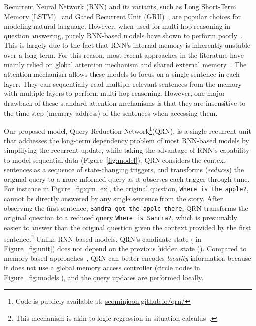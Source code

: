 \documentclass[table]{article}
\begin{document}
Recurrent Neural Network (RNN) and its variants, such as Long Short-Term Memory (LSTM)~\citep{lstm} and Gated Recurrent Unit (GRU)~\citep{GRU}, are popular choices for modeling natural language. However, when used for multi-hop reasoning in question answering, purely RNN-based models have shown to perform poorly~\citep{babi}. This is largely due to the fact that RNN's internal memory is inherently unstable over a long term. For this reason, most recent approaches in the literature have mainly relied on global attention mechanism and shared external memory~\citep{memN2N,NR,DMN+,graves2016hybrid}.
The attention mechanism allows these models to focus on a single sentence in each layer.
They can sequentially read multiple relevant sentences from the memory with multiple layers to perform multi-hop reasoning. However, one major drawback of these standard attention mechanisms is that they are insensitive to the time step (memory address) of the sentences when accessing them.


Our proposed model, Query-Reduction Network\footnote{Code is publicly available at: \url{seominjoon.github.io/qrn/}}(QRN), is a single recurrent unit that addresses the long-term dependency problem of most RNN-based models by simplifying the recurrent update, while taking the advantage of RNN's capability to model sequential data (Figure~\ref{fig:model}).
QRN considers the context sentences as a sequence of state-changing triggers, and transforms (\emph{reduces}) the original query to a more informed query as it observes each trigger through time. 
For instance in Figure~\ref{fig:qrn_ex}, 
the original question, \texttt{Where is the apple?}, cannot be directly answered by any single sentence from the story. After observing the first sentence, \texttt{Sandra got the apple there}, QRN transforms the original question to a reduced query \texttt{Where is Sandra?}, which is presumably easier to answer than the original question given the context provided by the first sentence.\footnote{This mechanism is akin to logic regression in situation calculus~\citep{reiter}.}
Unlike RNN-based models, QRN's candidate state ( in Figure~\ref{fig:unit}) does not depend on the previous hidden state (). 
Compared to memory-based approaches~\citep{memNet,memN2N,NR,DMN,DMN+}, QRN can better encodes \emph{locality} information because  it does not use a global memory access controller (circle nodes in Figure~\ref{fig:models}), and the query updates are performed locally.
\end{document}
